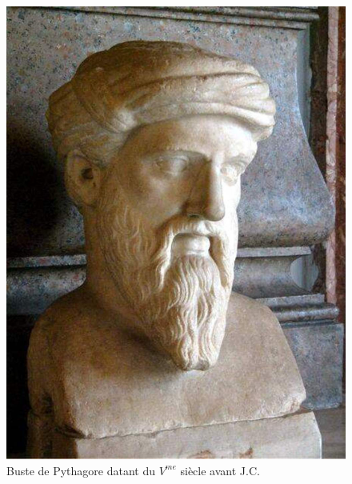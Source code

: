 \documentclass[a4paper,12pt]{article}
\begin{document}
\begin{remark}
\begin{figure}[H]\label{fig:pythagore}
    \centering
    \includegraphics[scale=0.4]{theorems/pythagore/pythagore.jpg}
    
    \caption{Buste de Pythagore datant du $V^{me}$ siècle avant J.C.}
    \label{fig:pythagore}
\end{figure}

\end{remark}
\end{document}
